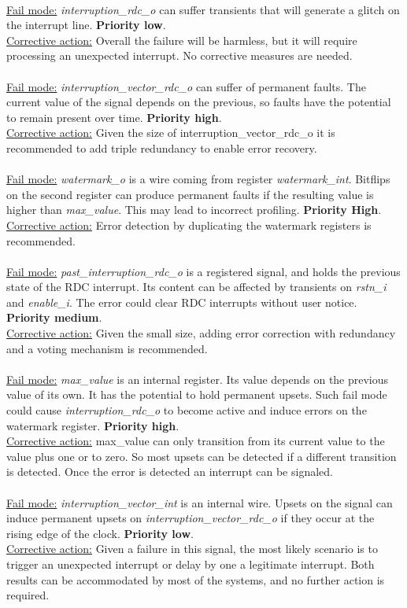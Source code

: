 \\
\underline{Fail mode:} \textit{interruption\_rdc\_o }can suffer transients that will generate a glitch on the interrupt line. \textbf{Priority low}.\\
\underline{Corrective action:} 
Overall the failure will be harmless, but it will require processing an unexpected interrupt. No corrective measures are needed. \\
\\
\underline{Fail mode:} \textit{interruption\_vector\_rdc\_o} can suffer of permanent faults. The current value of the signal depends on the previous, so faults have the potential to remain present over time. \textbf{Priority high}.\\
\underline{Corrective action:} Given the size of  interruption\_vector\_rdc\_o it is recommended to add triple redundancy to enable error recovery.\\
\\
\underline{Fail mode:} \textit{watermark\_o }is a wire coming from register\textit{ watermark\_int}. Bitflips on the second register can produce permanent faults if the resulting value is higher than \textit{max\_value}. This may lead to incorrect profiling. \textbf{Priority High}.\\
\underline{Corrective action:} Error detection by duplicating the watermark registers is recommended.\\
\\
\underline{Fail mode:} \textit{past\_interruption\_rdc\_o} is a registered signal, and holds the previous state of the RDC interrupt. Its content can be affected by transients on \textit{rstn\_i} and \textit{enable\_i}. The error could clear RDC interrupts without user notice. \textbf{Priority medium}.\\
\underline{Corrective action:} Given the small size, adding error correction with redundancy and a voting mechanism is recommended.\\
\\
\underline{Fail mode:} \textit{max\_value} is an internal register. Its value depends on the previous value of its own. It has the potential to hold permanent upsets. Such fail mode could cause  \textit{interruption\_rdc\_o} to become active and induce errors on the watermark register. \textbf{Priority high}.\\
\underline{Corrective action:} max\_value can only transition from its current value to the value plus one or to zero. So most upsets can be detected if a different transition is detected. Once the error is detected an interrupt can be signaled.\\
\\
\underline{Fail mode:} \textit{interruption\_vector\_int} is an internal wire. Upsets on the signal can induce permanent upsets on \textit{interruption\_vector\_rdc\_o} if they occur at the rising edge of the clock. \textbf{ Priority low}.\\
\underline{Corrective action:} 
Given a failure in this signal, the most likely scenario is to trigger an unexpected interrupt or delay by one a legitimate interrupt. Both results can be accommodated by most of the systems, and no further action is required.\\
\\